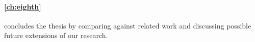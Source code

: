 \paragraph{\autoref{ch:eighth}} concludes the thesis by comparing against related work and discussing possible future extensions of our research.


%
%
%
%
%
